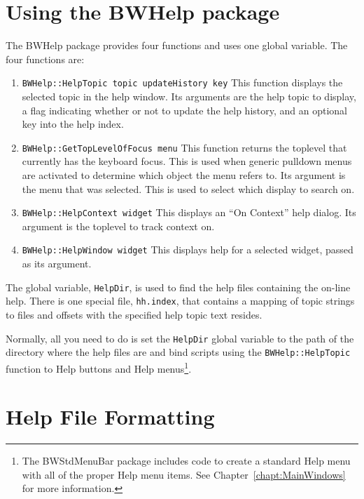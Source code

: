 \section{Using the BWHelp package}
\label{sect:BWH:BWHelpPackage}

The BWHelp package provides four functions and uses one global
variable.  The four functions are:

\begin{enumerate}
\item \lstinline=BWHelp::HelpTopic topic updateHistory key= This
function displays the selected topic in the help window. Its arguments
are the help topic to display, a flag indicating whether or not to
update the help history, and an optional key into the help index.
\item \lstinline=BWHelp::GetTopLevelOfFocus menu= This function returns
the toplevel that currently has the keyboard focus.  This is used when
generic pulldown menus are activated to determine which object the menu
refers to.  Its argument is the menu that was selected.  This is used to
select which display to search on.
\item \lstinline=BWHelp::HelpContext widget= This displays an ``On
Context'' help dialog. Its argument is the toplevel to track context on.
\item \lstinline=BWHelp::HelpWindow widget= This displays help for a
selected widget, passed as its argument.
\end{enumerate}

The global variable, \lstinline=HelpDir=, is used to find the help files
containing the on-line help.  There is one special file,
\lstinline=hh.index=, that contains a mapping of topic strings to files
and offsets with the specified help topic text resides.

Normally, all you need to do is set the \lstinline=HelpDir= global
variable to the path of the directory where the help files are and bind
scripts using the \lstinline=BWHelp::HelpTopic= function to Help buttons
and Help menus\footnote{The BWStdMenuBar package includes code to create
a standard Help menu with all of the proper Help menu items. See
Chapter~\ref{chapt:MainWindows} for more information.}.

\section{Help File Formatting}
\label{sect:BWH:HyperHelpFiles}

